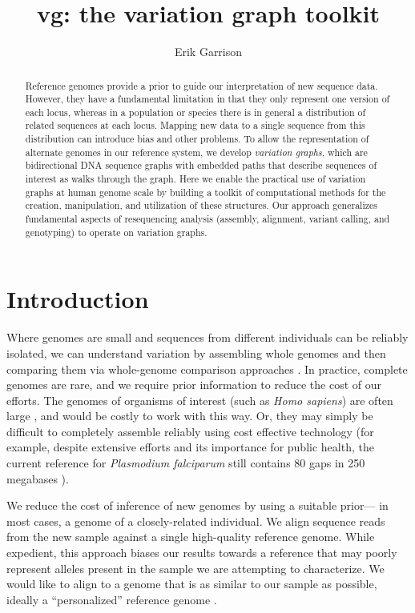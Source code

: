 \documentclass[12pt]{article}
\begin{document}
\title{vg: the variation graph toolkit}

\author{Erik Garrison}

\maketitle

\begin{abstract}
Reference genomes provide a prior to guide our interpretation of new sequence data.
However, they have a fundamental limitation in that they only represent one version of each locus, whereas
in a population or species there is in general a distribution of related sequences at each locus.
Mapping new data to a single sequence from this distribution can introduce bias and other problems.
To allow the representation of alternate genomes in our reference system, we develop \emph{variation graphs}, which are bidirectional DNA sequence graphs with embedded paths that describe sequences of interest as walks through the graph.
Here we enable the practical use of variation graphs at human genome scale
by building a toolkit of computational methods for the creation, manipulation, and utilization of these structures.
Our approach generalizes fundamental aspects of resequencing analysis (assembly, alignment, variant calling, and genotyping) to operate on variation graphs.
\end{abstract}

\section{Introduction}

Where genomes are small and sequences from different individuals can be reliably isolated, we can understand variation by assembling whole genomes and then comparing them via whole-genome comparison approaches \cite{mummer}.
In practice, complete genomes are rare, and we require prior information to reduce the cost of our efforts.
The genomes of organisms of interest (such as \emph{Homo sapiens}) are often large \cite{pmid11237011}, and would be costly to work with this way.
Or, they may simply be difficult to completely assemble reliably using cost effective technology (for example, despite extensive efforts and its importance for public health, the current reference for \emph{Plasmodium falciparum} still contains 80 gaps in 250 megabases \cite{pfalciparum, pfalciparumweb}).

We reduce the cost of inference of new genomes by using a suitable prior--- in most cases, a genome of a closely-related individual.
We align sequence reads from the new sample against a single high-quality reference genome.
While expedient, this approach biases our results towards a reference that may poorly represent alleles present in the sample we are attempting to characterize.
We would like to align to a genome that is as similar to our sample as possible, ideally a ``personalized'' reference genome \cite{Yuan_2012}.
\end{document}
